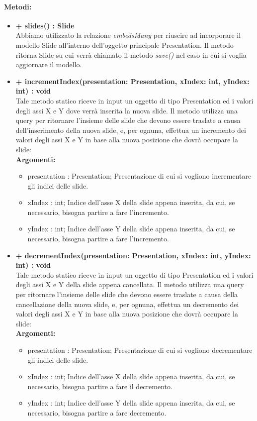 	\paragraph{Metodi:}
	\begin{itemize}
		\item \textbf{+ slides() : Slide}\\
		Abbiamo utilizzato la relazione \textit{embedsMany} per riuscire ad incorporare il modello \gls{Slide} all’interno dell’oggetto principale Presentation. Il metodo ritorna \gls{Slide} su cui verrà chiamato il metodo \textit{save()} nel caso in cui si voglia aggiornare il modello.
		\item \textbf{+ incrementIndex(presentation: Presentation, xIndex: int, yIndex: int) : void}\\
		Tale metodo statico riceve in input un oggetto di tipo Presentation ed i valori degli assi X e Y dove verrà inserita la nuova \gls{slide}. Il metodo utilizza una query per ritornare l'insieme delle \gls{slide} che devono essere traslate a causa dell'inserimento della nuova \gls{slide}, e, per ognuna, effettua un incremento dei valori degli assi X e Y in base alla nuova posizione che dovrà occupare la \gls{slide}:\\
		\textbf{Argomenti:}
		\begin{itemize}
			\item presentation : Presentation;
			Presentazione di cui si vogliono incrementare gli indici delle \gls{slide}.
			\item xIndex : int;
			Indice dell'asse X della \gls{slide} appena inserita, da cui, se necessario, bisogna partire a fare l'incremento.
			\item yIndex : int;
			Indice dell'asse Y della \gls{slide} appena inserita, da cui, se necessario, bisogna partire a fare l'incremento.
		\end{itemize}
		\item \textbf{+ decrementIndex(presentation: Presentation, xIndex: int, yIndex: int) : void}\\
		Tale metodo statico riceve in input un oggetto di tipo Presentation ed i valori degli assi X e Y della \gls{slide} appena cancellata. Il metodo utilizza una query per ritornare l'insieme delle \gls{slide} che devono essere traslate a causa della cancellazione della nuova \gls{slide}, e, per ognuna, effettua un decremento dei valori degli assi X e Y in base alla nuova posizione che dovrà occupare la \gls{slide}:\\
		\textbf{Argomenti:}
		\begin{itemize}
			\item presentation : Presentation;
			Presentazione di cui si vogliono decrementare gli indici delle \gls{slide}.
			\item xIndex : int;
			Indice dell'asse X della \gls{slide} appena inserita, da cui, se necessario, bisogna partire a fare il decremento.
			\item yIndex : int;
			Indice dell'asse Y della \gls{slide} appena inserita, da cui, se necessario, bisogna partire a fare decremento.
		\end{itemize}
	\end{itemize}
\newpage


